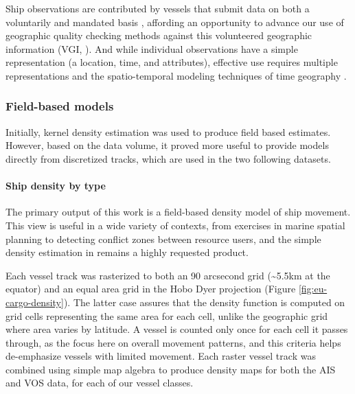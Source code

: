 Ship observations are contributed by vessels that submit data on both a voluntarily and mandated basis \citep{VOSClim,Tetreault2002}, affording an opportunity to advance our use of geographic quality checking methods \citep{goodchildli2012} against this volunteered geographic information (VGI, \cite{goodchild2007citizens}). And while individual observations have a simple representation (a location, time, and attributes), effective use requires multiple representations \citep{Goodchild1992} and the spatio-temporal modeling techniques of time geography \citep{miller2008field}.


\subsubsection{Field-based models}

Initially, kernel density estimation was used to produce field based estimates. However, based on the data volume, it proved more useful to provide models directly from discretized tracks, which are used in the two following datasets.

\paragraph{Ship density by type}

The primary output of this work is a field-based density model of ship movement. This view is useful in a wide variety of contexts, from exercises in marine spatial planning to detecting conflict zones between resource users, and the simple density estimation in \cite{Halpern2008} remains a highly requested product. %

Each vessel track was rasterized to both an 90 arcsecond grid (\textasciitilde{}5.5km at the equator) and an equal area grid in the Hobo Dyer projection (Figure \ref{fig:eu-cargo-density}). The latter case assures that the density function is computed on grid cells representing the same area for each cell, unlike the geographic grid where area varies by latitude. A vessel is counted only once for each cell it passes through, as the focus here on overall movement patterns, and this criteria helps de-emphasize vessels with limited movement. Each raster vessel track was combined using simple map algebra to produce density maps for both the AIS and VOS data, for each of our vessel classes. %

